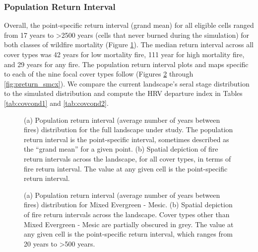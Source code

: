\subsubsection{Population Return Interval}
Overall, the point-specific return interval (grand mean) for all eligible cells ranged from 17 years to \textgreater 2500 years (cells that never burned during the simulation) for both classes of wildfire mortality (Figure \ref{fig:preturn}). The median return interval across all cover types was 42 years for low mortality fire, 111 year for high mortality fire, and 29 years for any fire. The population return interval plots and maps specific to each of the nine focal cover types follow (Figures \ref{fig:preturn_megm} through \ref{fig:preturn_smcx}). We compare the current landscape's seral stage distribution to the simulated distribution and compute the HRV departure index in Tables \ref{tab:covcond1} and \ref{tab:covcond2}.
\begin{figure}[!htbp]
  \centering
  \qquad
  \caption{(a) Population return interval (average number of years between fires) distribution for the full landscape under study. The population return interval is the point-specific interval, sometimes described as the ``grand mean'' for a given point. (b) Spatial depiction of fire return intervals across the landscape, for all cover types, in terms of fire return interval. The value at any given cell is the point-specific return interval.}
  \label{fig:preturn}
\end{figure}


\begin{figure}[!htbp]
  \centering
  \caption{(a) Population return interval (average number of years between fires) distribution for Mixed Evergreen - Mesic. (b) Spatial depiction of fire return intervals across the landscape. Cover types other than Mixed Evergreen - Mesic are partially obscured in grey. The value at any given cell is the point-specific return interval, which ranges from 20 years to \textgreater 500 years.}
    \label{fig:preturn_megm}
\end{figure}

